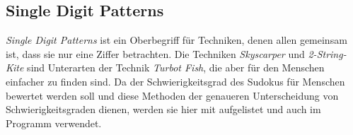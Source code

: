 \newpage
\subsection{Single Digit Patterns}
\textit{Single Digit Patterns} ist ein Oberbegriff für Techniken, denen allen gemeinsam ist, dass sie nur eine Ziffer betrachten. Die Techniken \textit{Skyscarper} und \textit{2-String-Kite} sind Unterarten der Technik \textit{Turbot Fish}, die aber für den Menschen einfacher zu finden sind. Da der Schwierigkeitsgrad des Sudokus für Menschen bewertet werden soll und diese Methoden der genaueren Unterscheidung von Schwierigkeitsgraden dienen, werden sie hier mit aufgelistet und auch im Programm verwendet.